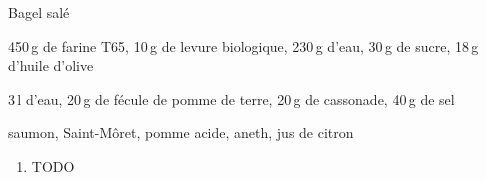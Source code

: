 \begin{recette}{Bagel salé}
	\begin{ingredients}
			450\,g de farine T65\sep
			10\,g de levure biologique\sep
			230\,g d'eau\sep
			30\,g de sucre\sep
			18\,g d'huile d'olive
	\end{ingredients}
	\begin{ingredients}
			3\,l d'eau\sep
			20\,g de fécule de pomme de terre\sep
			20\,g de cassonade\sep
			40\,g de sel
	\end{ingredients}
	\begin{ingredients}
			saumon\sep
			Saint-Môret\sep
			pomme acide\sep
			aneth\sep
			jus de citron
	\end{ingredients}
	
	\begin{enumerate}
		\item TODO
	\end{enumerate}
\end{recette}
